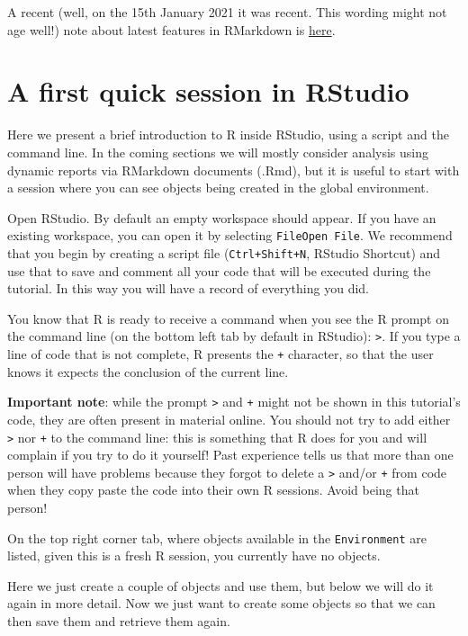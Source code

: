 \documentclass[
]{article}
\begin{document}
A recent (well, on the 15th January 2021 it was recent. This wording
might not age well!) note about latest features in RMarkdown is
\href{https://blog.rstudio.com/2020/12/21/rmd-news/}{here}.

\section{A first quick session in
RStudio}\label{a-first-quick-session-in-rstudio}

Here we present a brief introduction to R inside RStudio, using a script
and the command line. In the coming sections we will mostly consider
analysis using dynamic reports via RMarkdown documents (.Rmd), but it is
useful to start with a session where you can see objects being created
in the global environment.

Open RStudio. By default an empty workspace should appear. If you have
an existing workspace, you can open it by selecting
\texttt{File\textbar{}Open\ File}. We recommend that you begin by
creating a script file (\texttt{Ctrl+Shift+N}, RStudio Shortcut) and use
that to save and comment all your code that will be executed during the
tutorial. In this way you will have a record of everything you did.

You know that R is ready to receive a command when you see the R prompt
on the command line (on the bottom left tab by default in RStudio):
\texttt{\textgreater{}}. If you type a line of code that is not
complete, R presents the \texttt{+} character, so that the user knows it
expects the conclusion of the current line.

\textbf{Important note}: while the prompt \texttt{\textgreater{}} and
\texttt{+} might not be shown in this tutorial's code, they are often
present in material online. You should not try to add either
\texttt{\textgreater{}} nor \texttt{+} to the command line: this is
something that R does for you and will complain if you try to do it
yourself! Past experience tells us that more than one person will have
problems because they forgot to delete a \texttt{\textgreater{}} and/or
\texttt{+} from code when they copy paste the code into their own R
sessions. Avoid being that person!

On the top right corner tab, where objects available in the
\texttt{Environment} are listed, given this is a fresh R session, you
currently have no objects.

Here we just create a couple of objects and use them, but below we will
do it again in more detail. Now we just want to create some objects so
that we can then save them and retrieve them again.
\end{document}
